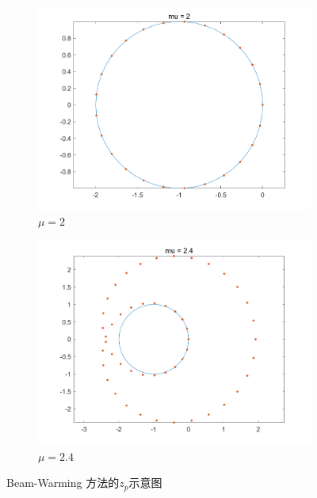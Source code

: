 \documentclass[twoside,a4paper]{article}
\begin{document}
\begin{figure}[htbp]
\begin{subfigure}[b]{0.45\textwidth}
      \includegraphics[width=\textwidth]{mu_2.png}
      \caption{$\mu=2$}
  \end{subfigure}
  \begin{subfigure}[b]{0.45\textwidth}
      \includegraphics[width=\textwidth]{mu_2.4.png}
      \caption{$\mu=2.4$}
  \end{subfigure}
  \caption{Beam-Warming 方法的$z_p$示意图}
\end{figure}
\end{document}

